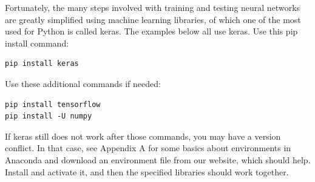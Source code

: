 \documentclass{book}
\theoremstyle{plain}
\theoremstyle{definition}
\numberwithin{exm}{chapter}
\theoremstyle{remark}
\theoremstyle{summary}
\theoremstyle{overview}
\begin{document}
Fortunately, the many steps involved with training and testing neural networks are greatly simplified using machine learning libraries, of which one of the most used for Python is called keras. The examples below all use keras. Use this pip install command:
\begin{lstlisting}
pip install keras
\end{lstlisting}
Use these additional commands if needed:
\begin{lstlisting}
pip install tensorflow
pip install -U numpy
\end{lstlisting}
If keras still does not work after those commands, you may have a version conflict. In that case, see Appendix A for some basics about environments in Anaconda and download an environment file from our website, which should help. Install and activate it, and then the specified libraries should work together.
\end{document}
